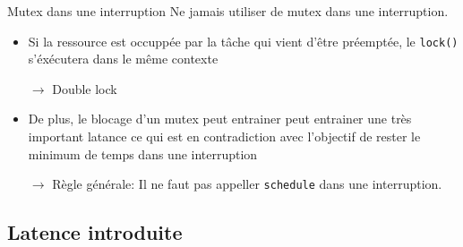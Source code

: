 \begin{frame}[fragile]{Mutex dans une interruption}
  Ne jamais utiliser de mutex dans une interruption.
  \begin{itemize} 
  \item Si  la ressource  est occuppée par  la tâche qui  vient d'être
    préemptée, le \texttt{lock()} s'éxécutera dans le même contexte
  \item[$\rightarrow$] Double lock
  \item De plus,  le blocage d'un mutex peut  entrainer peut entrainer
    une  très  important latance  ce  qui  est  en contradiction  avec
    l'objectif de rester le minimum de temps dans une interruption
  \item[$\rightarrow$] Règle générale: Il ne faut pas appeller \texttt{schedule} dans une interruption.
  \end{itemize} 
\end{frame} 

\subsection{Latence introduite}

